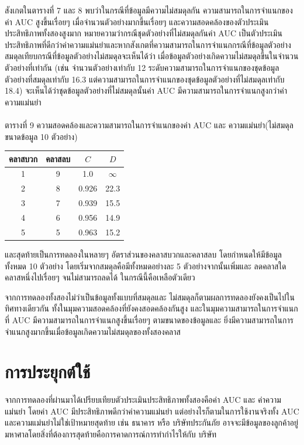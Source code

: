 \documentclass[twoside, twocolumn, 12pt]{article}
\begin{document}
สังเกตในตารางที่ 7 และ 8 พบว่าในกรณีที่ข้อมูลมีความไม่สมดุลกัน ความสามารถในการจำแนกของค่า AUC สูงขึ้นเรื่อยๆ เมื่อจำนวนตัวอย่างมากขึ้นเรื่อยๆ และความสอดคล้องของตัวประเมินประสิทธิภาพทั้งสองสูงมาก หมายความว่ากรณีชุดตัวอย่างที่ไม่สมดุลกันค่า AUC เป็นตัวประเมินประสิทธิภาพที่ดีกว่าค่าความแม่นยำและหากสังเกตที่ความสามารถในการจำแนกกรณีที่ข้อมูลตัวอย่างสมดุลเทียบกรณีที่ข้อมูลตัวอย่างไม่สมดุลจะเห็นได้ว่า เมื่อข้อมูลตัวอย่างเกิดความไม่สมดุลขึ้นในจำนวนตัวอย่างที่เท่ากัน (เช่น จำนวนตัวอย่างเท่ากับ 12 ระดับความสามารถในการจำแนกของชุดข้อมูลตัวอย่างที่สมดุลเท่ากับ 16.3 แต่ความสามารถในการจำแนกของชุดข้อมูลตัวอย่างที่ไม่สมดุลเท่ากับ 18.4) จะเห็นได้ว่าชุดข้อมูลตัวอย่างที่ไม่สมดุลนั้นค่า AUC มีความสามารถในการจำแนกสูงกว่าค่าความแม่นยำ
\\\\
ตารางที่ 9 ความสอดคล้องและความสามารถในการจำแนกของค่า AUC และ ความแม่นยำ(ไม่สมดุล ขนาดข้อมูล 10 ตัวอย่าง)
\begin{center}
\begin{tabular}{|cccc|}
\hline
คลาสบวก & คลาสลบ & $C$ & $D$\\
\hline
1&9&1.0 &$\infty$\\\hline
2&8&0.926&22.3\\\hline
3&7&0.939&15.5\\\hline
4&6&0.956&14.9\\\hline
5&5&0.963&15.2\\\hline
\end{tabular}
\end{center}

และสุดท้ายเป็นการทดลองในหลายๆ อัตราส่วนของคลาสบวกและคลาสลบ โดยกำหนดให้มีข้อมูลทั้งหมด 10 ตัวอย่าง โดยเริ่มจากสมดุลคือมีทั้งหมดอย่างละ 5 ตัวอย่างจากนั้นเพิ่มและ ลดคลาสใดคลาสหนึ่งไปเรื่อยๆ จนไม่สามารถลดได้ ในกรณีนี้คือเหลือตัวเดียว

จากการทดลองทั้งสองไม่ว่าเป็นข้อมูลทั้งแบบที่สมดุลและ ไม่สมดุลก็ตามผลการทดลองยังคงเป็นไปในทิศทางเดียวกัน ทั้งในมุมความสอดคล้องที่ยังคงสอดคล้องกันสูง และในมุมความสามารถในการจำแนกที่ AUC มีความสามารถในการจำแนกสูงขึ้นเรื่อยๆ ตามขนาดของข้อมูลและ ยิ่งมีความสามารถในการจำแนกสูงมากขึ้นเมื่อข้อมูลเกิดความไม่สมดุลของทั้งสองคลาส


\section{การประยุกต์ใช้}
\quad จากการทดลองที่ผ่านมาได้เปรียบเทียบตัวประเมินประสิทธิภาพทั้งสองคือค่า AUC และ ค่าความแม่นยำ โดยค่า AUC มีประสิทธิภาพดีกว่าค่าความแม่นยำ แต่อย่างไรก็ตามในการใช้งานจริงทั้ง AUC และความแม่นยำไม่ใช่เป้าหมายสุดท้าย เช่น  ธนาคาร หรือ บริษัทประกันภัย อาจจะมีข้อมูลของลูกค้าอยู่มหาศาลโดยสิ่งที่ต้องการสุดท้ายคือการคาดการณ์การทำกำไรให้กับ บริษัท
\end{document}
